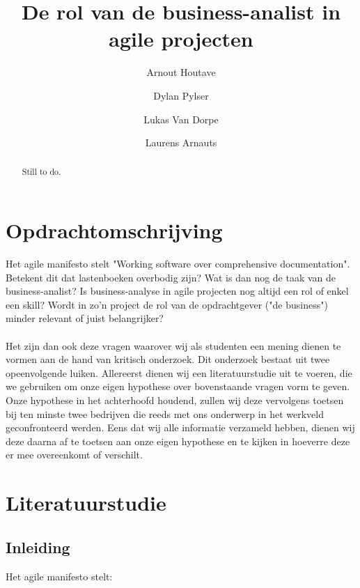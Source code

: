 \documentclass{hogent-article}
\title{De rol van de business-analist in agile projecten}
\author{Arnout Houtave}
\author{Dylan Pylser}
\author{Lukas Van Dorpe}
\author{Laurens Arnauts}
\begin{document}
\begin{abstract}
 Still to do.
\end{abstract}

\tableofcontents


\section{Opdrachtomschrijving}
Het agile manifesto stelt "Working software over comprehensive documentation". Betekent dit dat lastenboeken overbodig zijn? Wat is dan nog de taak van de business-analist? Is business-analyse in agile projecten nog altijd een rol of enkel een skill? Wordt in zo'n project de rol van de opdrachtgever ("de business") minder relevant of juist belangrijker?  
\\~\\
Het zijn dan ook deze vragen waarover wij als studenten een mening dienen te vormen aan de hand van kritisch onderzoek. Dit onderzoek bestaat uit twee opeenvolgende luiken. Allereerst dienen wij een literatuurstudie uit te voeren, die we gebruiken om onze eigen hypothese over bovenstaande vragen vorm te geven. Onze hypothese in het achterhoofd houdend, zullen wij deze vervolgens toetsen bij ten minste twee bedrijven die reeds met ons onderwerp in het werkveld geconfronteerd werden. Eens dat wij alle informatie verzameld hebben, dienen wij deze daarna af te toetsen aan onze eigen hypothese en te kijken in hoeverre deze er mee overeenkomt of verschilt.
\newpage

\section{Literatuurstudie}
\subsection{Inleiding}

Het agile manifesto stelt:
\end{document}
